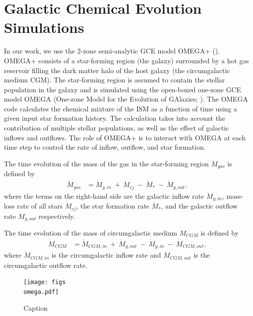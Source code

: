 \documentclass{brandeis-thesis3.2}
\begin{document}

\section{Galactic Chemical Evolution Simulations} \label{gce}
In our work, we use the 2-zone semi-analytic GCE model OMEGA+ (\citealt{Cote_2018}). OMEGA+ consists of a star-forming region (the galaxy) surrounded by a hot gas reservoir filling the dark matter halo of the host galaxy (the circumgalactic medium CGM). The star-forming region is assumed to contain the stellar population in the galaxy and is simulated using the open-boxed one-zone GCE model OMEGA (One-zone Model for the Evolution of GAlaxies; \citealt{cote17}). The OMEGA code calculates the chemical mixture of the ISM as a function of time using a given input star formation history. The calculation takes into account the contribution of multiple stellar populations, as well as the effect of galactic inflows and outflows. The role of OMEGA+ is to interact with OMEGA at each time step to control the rate of inflow, outflow, and star formation. 

The time evolution of the mass of the gas in the star-forming region $M_{gas}$ is defined by
\begin{align}
    \dot{M}_{gas} &= \dot{M}_{g, in}\ +\ \dot{M}_{ej}\ -\ \dot{M}_{*}\ -\ \dot{M}_{g, out},
\end{align}
where the terms on the right-hand side are the galactic inflow rate $\dot{M}_{g, in}$, mass-loss rate of all stars $\dot{M}_{ej}$, the star formation rate $\dot{M}_{*}$, and the galactic outflow rate $\dot{M}_{g, out}$ respectively.

The time evolution of the mass of circumgalactic medium $M_{CGM}$ is defined by
\begin{align}
     \dot{M}_{CGM} &= \dot{M}_{CGM, in}\ +\ \dot{M}_{g, out}\ -\ \dot{M}_{g, in}\ -\ \dot{M}_{CGM, out},
\end{align}
where $\dot{M}_{CGM, in}$ is the circumgalactic inflow rate and $\dot{M}_{CGM, out}$ is the circumgalactic outflow rate. 

\begin{figure}
    \centering
    \texttt{[image: figs\\omega.pdf]}
    \caption{Caption}
    \label{fig:omega}
\end{figure}
\end{document}
